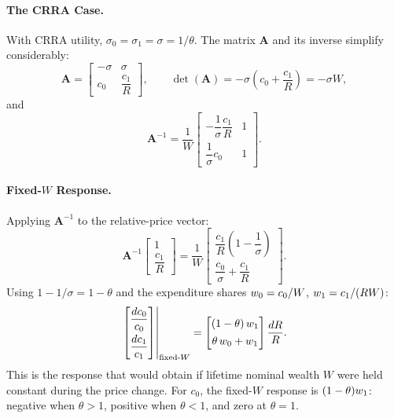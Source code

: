 \paragraph{The CRRA Case.}
With CRRA utility, $\sigma_0 = \sigma_1 = \sigma = 1/\theta$. The matrix $\mathbf{A}$ and its inverse simplify considerably:
\begin{equation}
\mathbf{A} = \begin{bmatrix} -\sigma & \sigma \\[4pt] c_0 & \dfrac{c_1}{R} \end{bmatrix}, \qquad
\det(\mathbf{A}) = -\sigma \left( c_0 + \frac{c_1}{R} \right) = -\sigma W,
\label{eq:A-crra}
\end{equation}
and
\begin{equation}
\mathbf{A}^{-1} = \frac{1}{W} \begin{bmatrix} -\dfrac{1}{\sigma} \dfrac{c_1}{R} & 1 \\[4pt] \dfrac{1}{\sigma} c_0 & 1 \end{bmatrix}.
\label{eq:A-inverse}
\end{equation}

\paragraph{Fixed-$W$ Response.}
Applying $\mathbf{A}^{-1}$ to the relative-price vector:
\begin{equation}
\mathbf{A}^{-1} \begin{bmatrix} 1 \\[4pt] \dfrac{c_1}{R} \end{bmatrix}
= \frac{1}{W} \begin{bmatrix} \dfrac{c_1}{R}\left(1 - \dfrac{1}{\sigma}\right) \\[8pt] \dfrac{c_0}{\sigma} + \dfrac{c_1}{R} \end{bmatrix}.
\label{eq:sub-effect-calc}
\end{equation}
Using $1 - 1/\sigma = 1 - \theta$ and the expenditure shares $w_0 = c_0/W$, $w_1 = c_1/(RW)$:
\begin{equation}
\left.\begin{bmatrix} \dfrac{dc_0}{c_0} \\[8pt] \dfrac{dc_1}{c_1} \end{bmatrix}\right|_{\text{fixed-}W} = \begin{bmatrix} (1-\theta) \, w_1 \\[4pt] \theta \, w_0 + w_1 \end{bmatrix} \frac{dR}{R}.
\label{eq:fixed-W-effect}
\end{equation}
This is the response that would obtain if lifetime nominal wealth $W$ were held constant during the price change. For $c_0$, the fixed-$W$ response is $(1-\theta)w_1$: negative when $\theta>1$, positive when $\theta<1$, and zero at $\theta=1$.

